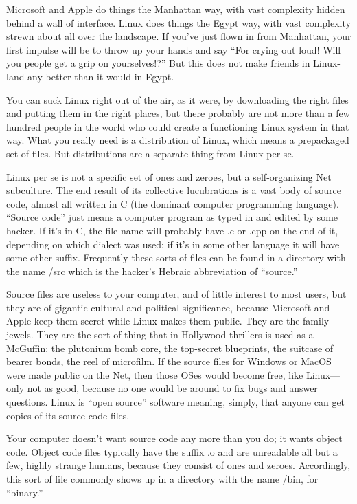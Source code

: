 \documentclass[
  fontsize=11pt,
  paper=landscape,
  twocolumn=true,
  pagesize=pdftex,
  headings=small,
  DIV=15,
  ]{scrartcl}
\begin{document}
Microsoft and Apple do things the Manhattan way, with vast complexity
hidden behind a wall of interface. Linux does things the Egypt way, with
vast complexity strewn about all over the landscape. If you've just
flown in from Manhattan, your first impulse will be to throw up your
hands and say ``For crying out loud! Will you people get a grip on
yourselves!?'' But this does not make friends in Linux-land any better
than it would in Egypt.

You can suck Linux right out of the air, as it were, by downloading the
right files and putting them in the right places, but there probably are
not more than a few hundred people in the world who could create a
functioning Linux system in that way. What you really need is a
distribution of Linux, which means a prepackaged set of files. But
distributions are a separate thing from Linux per se.

Linux per se is not a specific set of ones and zeroes, but a
self-organizing Net subculture. The end result of its collective
lucubrations is a vast body of source code, almost all written in C (the
dominant computer programming language). ``Source code'' just means a
computer program as typed in and edited by some hacker. If it's in C,
the file name will probably have .c or .cpp on the end of it, depending
on which dialect was used; if it's in some other language it will have
some other suffix. Frequently these sorts of files can be found in a
directory with the name /src which is the hacker's Hebraic abbreviation
of ``source.''

Source files are useless to your computer, and of little interest to
most users, but they are of gigantic cultural and political
significance, because Microsoft and Apple keep them secret while Linux
makes them public. They are the family jewels. They are the sort of
thing that in Hollywood thrillers is used as a McGuffin: the plutonium
bomb core, the top-secret blueprints, the suitcase of bearer bonds, the
reel of microfilm. If the source files for Windows or MacOS were made
public on the Net, then those OSes would become free, like Linux---only
not as good, because no one would be around to fix bugs and answer
questions. Linux is ``open source'' software meaning, simply, that
anyone can get copies of its source code files.

Your computer doesn't want source code any more than you do; it wants
object code. Object code files typically have the suffix .o and are
unreadable all but a few, highly strange humans, because they consist of
ones and zeroes. Accordingly, this sort of file commonly shows up in a
directory with the name /bin, for ``binary.''
\end{document}
